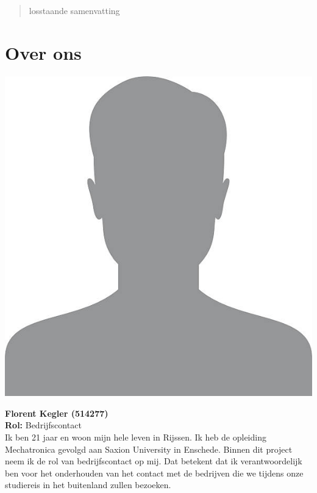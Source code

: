 \documentclass{BK5}
\author{Stijn van Straten {\small (493809)}\\
	Marijn van der Gracht {\small (499194)}\\
	Tristan van Duuren {\small (480101)}\\
	Florent Kegler {\small (514277)}
}
\date{\today}
\begin{document}
	\maketitle
	
	\begin{abstract}
		losstaande samenvatting
	\end{abstract}
	
	\section{Over ons}
	
	\begin{minipage}{0.5\linewidth}
		\includegraphics[width=\linewidth]{unknown.jpg}
	\end{minipage}
	\hfill
	\vspace{1cm}
	\begin{minipage}{\linewidth}
		\textbf{Florent Kegler (514277)} \\
		\textbf{Rol:} Bedrijfscontact \\
		Ik ben 21 jaar en woon mijn hele leven in Rijssen. Ik heb de opleiding Mechatronica gevolgd aan Saxion University in Enschede. Binnen dit project neem ik de rol van bedrijfscontact op mij. Dat betekent dat ik verantwoordelijk ben voor het onderhouden van het contact met de bedrijven die we tijdens onze studiereis in het buitenland zullen bezoeken.
	\end{minipage}
	
\end{document}
